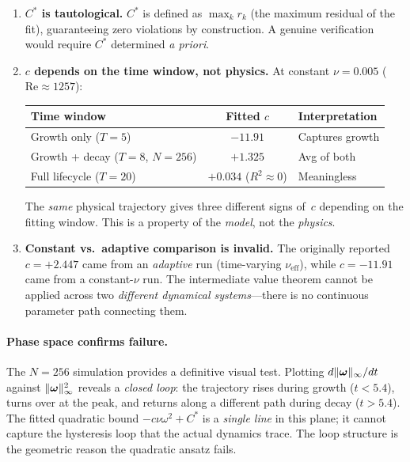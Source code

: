 \begin{enumerate}
\item \textbf{$C^*$ is tautological.}  $C^*$ is defined as
  $\max_k r_k$ (the maximum residual of the fit), guaranteeing
  zero violations by construction.  A genuine verification
  would require $C^*$ determined \emph{a priori}.

\item \textbf{$c$ depends on the time window, not physics.}
  At constant $\nu = 0.005$ ($\mathrm{Re} \approx 1257$):
  \begin{center}
  \begin{tabular}{@{}lcl@{}}
  \toprule
  Time window & Fitted $c$ & Interpretation \\
  \midrule
  Growth only ($T=5$) & $-11.91$ & Captures growth \\
  Growth + decay ($T=8$, $N=256$) & $+1.325$ & Avg of both \\
  Full lifecycle ($T=20$) & $+0.034$ ($R^2 \approx 0$) & Meaningless \\
  \bottomrule
  \end{tabular}
  \end{center}
  The \emph{same} physical trajectory gives three different
  signs of~$c$ depending on the fitting window.
  This is a property of the \emph{model}, not the \emph{physics}.

\item \textbf{Constant vs.\ adaptive comparison is invalid.}
  The originally reported $c = +2.447$ came from an
  \emph{adaptive} run (time-varying $\nu_{\mathrm{eff}}$),
  while $c = -11.91$ came from a constant-$\nu$ run.  The
  intermediate value theorem cannot be applied across two
  \emph{different dynamical systems}---there is no
  continuous parameter path connecting them.
\end{enumerate}

\paragraph{Phase space confirms failure.}
The $N=256$ simulation provides a definitive visual test.
Plotting $d\lVert \bm{\omega} \rVert_\infty/dt$ against
$\lVert \bm{\omega} \rVert_\infty^2$ reveals a \emph{closed loop}:
the trajectory rises during growth ($t < 5.4$), turns over
at the peak, and returns along a different path during decay
($t > 5.4$).  The fitted quadratic bound
$-c\nu\omega^2 + C^*$ is a \emph{single line} in this plane;
it cannot capture the hysteresis loop that the actual dynamics
trace.  The loop structure is the geometric reason the quadratic
ansatz fails.

